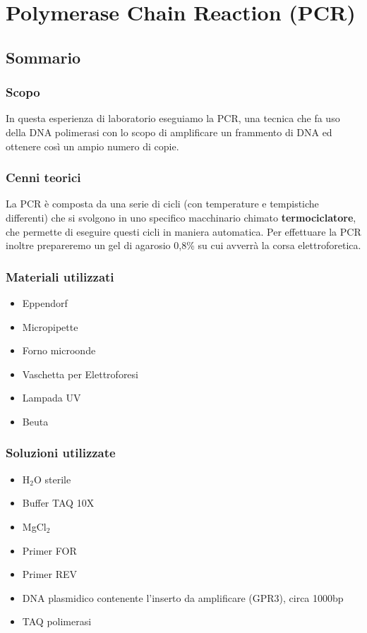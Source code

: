 \section{\LARGE{Polymerase Chain Reaction (PCR)}}

\vspace{0.6cm}


\subsection{Sommario}

\subsubsection{Scopo}

In questa esperienza di laboratorio eseguiamo la PCR, una tecnica che fa uso della
DNA polimerasi con lo scopo di amplificare un frammento di DNA ed ottenere così un
ampio numero di copie.\\

\subsubsection{Cenni teorici}

La PCR è composta da una serie di cicli (con temperature e tempistiche differenti)
che si svolgono in uno specifico macchinario chimato \textbf{termociclatore},
che permette di eseguire questi cicli in maniera automatica.
Per effettuare la PCR inoltre prepareremo un gel di agarosio 0,8\%
su cui avverrà la corsa elettroforetica.

\subsubsection{Materiali utilizzati}

\begin{itemize}
	\item Eppendorf
	\item Micropipette
	\item Forno microonde
	\item Vaschetta per Elettroforesi
	\item Lampada UV
	\item Beuta
\end{itemize}

\subsubsection{Soluzioni utilizzate}
\begin{itemize}
	\item H$_2$O sterile
	\item Buffer TAQ 10X
	\item MgCl$_2$
	\item Primer FOR
	\item Primer REV
	\item DNA plasmidico contenente l'inserto da amplificare (GPR3), circa 1000bp
	\item TAQ polimerasi
\end{itemize}


